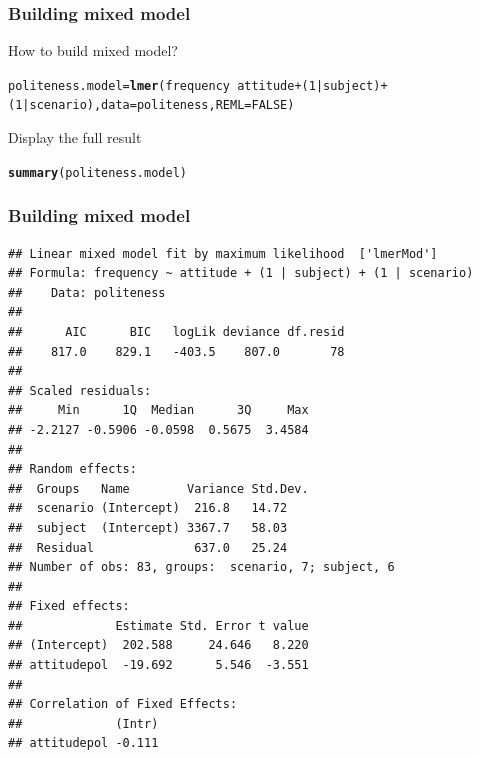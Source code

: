 \documentclass[10p]{beamer}\usepackage[]{graphicx}\usepackage[]{color}
\makeatletter
\newcommand{\hlnum}[1]{\textcolor[rgb]{0.686,0.059,0.569}{#1}}%
\newcommand{\hlopt}[1]{\textcolor[rgb]{0,0,0}{#1}}%
\newcommand{\hlstd}[1]{\textcolor[rgb]{0.345,0.345,0.345}{#1}}%
\newcommand{\hlkwb}[1]{\textcolor[rgb]{0.69,0.353,0.396}{#1}}%
\newcommand{\hlkwc}[1]{\textcolor[rgb]{0.333,0.667,0.333}{#1}}%
\newcommand{\hlkwd}[1]{\textcolor[rgb]{0.737,0.353,0.396}{\textbf{#1}}}%
\newenvironment{kframe}{%
 \def\at@end@of@kframe{}%
 \ifinner\ifhmode%
  \def\at@end@of@kframe{\end{minipage}}%
  \begin{minipage}{\columnwidth}%
 \fi\fi%
 \def\FrameCommand##1{\hskip\@totalleftmargin \hskip-\fboxsep
 \colorbox{shadecolor}{##1}\hskip-\fboxsep
     \hskip-\linewidth \hskip-\@totalleftmargin \hskip\columnwidth}%
 \MakeFramed {\advance\hsize-\width
   \@totalleftmargin\z@ \linewidth\hsize
   \@setminipage}}%
 {\par\unskip\endMakeFramed%
 \at@end@of@kframe}
\newenvironment{knitrout}{}{} %
\makeatother
\begin{document}
\begin{frame}[fragile]
\frametitle{Building mixed model}
How to build mixed model?
\begin{knitrout}\scriptsize
{}\color{fgcolor}\begin{kframe}
\begin{alltt}
\hlstd{politeness.model} \hlkwb{=} \hlkwd{lmer}\hlstd{(frequency} \hlopt{~} \hlstd{attitude} \hlopt{+} \hlstd{(}\hlnum{1}\hlopt{|}\hlstd{subject)} \hlopt{+}
        \hlstd{(}\hlnum{1}\hlopt{|}\hlstd{scenario),} \hlkwc{data}\hlstd{=politeness,} \hlkwc{REML}\hlstd{=}\hlnum{FALSE}\hlstd{)}
\end{alltt}
\end{kframe}
\end{knitrout}
Display the full result
\begin{knitrout}\scriptsize
{}\color{fgcolor}\begin{kframe}
\begin{alltt}
\hlkwd{summary}\hlstd{(politeness.model)}
\end{alltt}
\end{kframe}
\end{knitrout}
\end{frame}

\begin{frame}[fragile]
\frametitle{Building mixed model}
\begin{knitrout}\scriptsize
{}\color{fgcolor}\begin{kframe}
\begin{verbatim}
## Linear mixed model fit by maximum likelihood  ['lmerMod']
## Formula: frequency ~ attitude + (1 | subject) + (1 | scenario)
##    Data: politeness
## 
##      AIC      BIC   logLik deviance df.resid 
##    817.0    829.1   -403.5    807.0       78 
## 
## Scaled residuals: 
##     Min      1Q  Median      3Q     Max 
## -2.2127 -0.5906 -0.0598  0.5675  3.4584 
## 
## Random effects:
##  Groups   Name        Variance Std.Dev.
##  scenario (Intercept)  216.8   14.72   
##  subject  (Intercept) 3367.7   58.03   
##  Residual              637.0   25.24   
## Number of obs: 83, groups:  scenario, 7; subject, 6
## 
## Fixed effects:
##             Estimate Std. Error t value
## (Intercept)  202.588     24.646   8.220
## attitudepol  -19.692      5.546  -3.551
## 
## Correlation of Fixed Effects:
##             (Intr)
## attitudepol -0.111
\end{verbatim}
\end{kframe}
\end{knitrout}
\end{frame}
\end{document}
